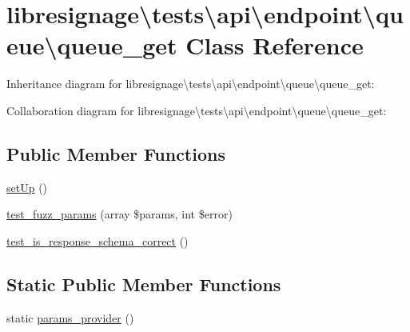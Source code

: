 \hypertarget{classlibresignage_1_1tests_1_1api_1_1endpoint_1_1queue_1_1queue__get}{}\section{libresignage\textbackslash{}tests\textbackslash{}api\textbackslash{}endpoint\textbackslash{}queue\textbackslash{}queue\+\_\+get Class Reference}
\label{classlibresignage_1_1tests_1_1api_1_1endpoint_1_1queue_1_1queue__get}


Inheritance diagram for libresignage\textbackslash{}tests\textbackslash{}api\textbackslash{}endpoint\textbackslash{}queue\textbackslash{}queue\+\_\+get\+:


Collaboration diagram for libresignage\textbackslash{}tests\textbackslash{}api\textbackslash{}endpoint\textbackslash{}queue\textbackslash{}queue\+\_\+get\+:
\subsection*{Public Member Functions}
\begin{DoxyCompactItemize}
\item 
\hyperlink{classlibresignage_1_1tests_1_1api_1_1endpoint_1_1queue_1_1queue__get_af1ac16be5ff60fe798a21d638078328e}{set\+Up} ()
\item 
\hyperlink{classlibresignage_1_1tests_1_1api_1_1endpoint_1_1queue_1_1queue__get_a0d8c8f153d5e14d2313d1c353b165c77}{test\+\_\+fuzz\+\_\+params} (array \$params, int \$error)
\item 
\hyperlink{classlibresignage_1_1tests_1_1api_1_1endpoint_1_1queue_1_1queue__get_a8791de85cbfeac5700eb96a2e1f57015}{test\+\_\+is\+\_\+response\+\_\+schema\+\_\+correct} ()
\end{DoxyCompactItemize}
\subsection*{Static Public Member Functions}
\begin{DoxyCompactItemize}
\item 
static \hyperlink{classlibresignage_1_1tests_1_1api_1_1endpoint_1_1queue_1_1queue__get_aba90b6a4919f0f07869b7c422a04e0c5}{params\+\_\+provider} ()
\end{DoxyCompactItemize}
